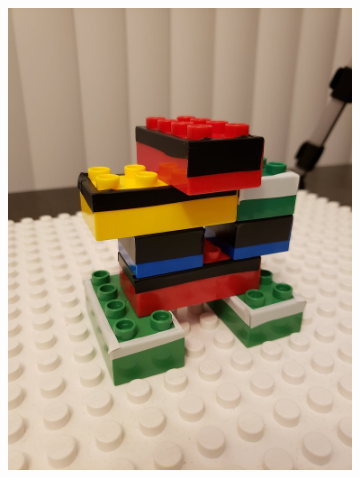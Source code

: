 \begin{figure}[H]
\begin{subfigure}{0.5\textwidth}
       \caption[{}]{ \label{fig:fig_3-6e}}
    \end{subfigure}
    \begin{subfigure}{0.5\textwidth}
       \centering
       \includegraphics[width=0.8\linewidth,trim={0 15cm 0 15cm},clip]{figures/t7.jpg}
       

\end{subfigure}
\end{figure}
